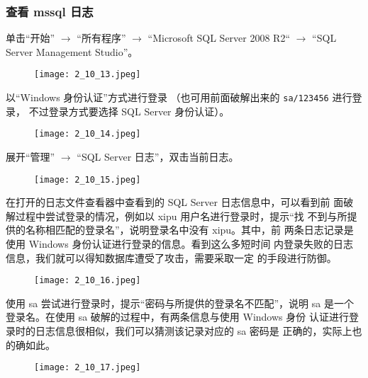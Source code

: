 \subsubsection{查看 mssql 日志}
单击``开始'' $ \rightarrow $ ``所有程序''
$ \rightarrow $ ``Microsoft SQL Server 2008 R2`` $ \rightarrow $
``SQL Server Management Studio''。
\begin{figure}[H]
  \begin{center}
    \texttt{[image: 2\_10\_13.jpeg]}
  \end{center}
\end{figure}

以``Windows 身份认证''方式进行登录
（也可用前面破解出来的 \texttt{sa/123456} 进行登录，
不过登录方式要选择 SQL Server 身份认证）。
\begin{figure}[H]
  \begin{center}
    \texttt{[image: 2\_10\_14.jpeg]}
  \end{center}
\end{figure}

展开``管理'' $ \rightarrow $ ``SQL Server 日志''，双击当前日志。
\begin{figure}[H]
  \begin{center}
    \texttt{[image: 2\_10\_15.jpeg]}
  \end{center}
\end{figure}

在打开的日志文件查看器中查看到的 SQL Server 日志信息中，可以看到前
面破解过程中尝试登录的情况，例如以 xipu 用户名进行登录时，提示``找
不到与所提供的名称相匹配的登录名''，说明登录名中没有 xipu。其中，前
两条日志记录是使用 Windows 身份认证进行登录的信息。看到这么多短时间
内登录失败的日志信息，我们就可以得知数据库遭受了攻击，需要采取一定
的手段进行防御。
\begin{figure}[H]
  \begin{center}
    \texttt{[image: 2\_10\_16.jpeg]}
  \end{center}
\end{figure}

使用 sa 尝试进行登录时，提示``密码与所提供的登录名不匹配''，说明 sa
是一个登录名。在使用 sa 破解的过程中，有两条信息与使用 Windows 身份
认证进行登录时的日志信息很相似，我们可以猜测该记录对应的 sa 密码是
正确的，实际上也的确如此。
\begin{figure}[H]
  \begin{center}
    \texttt{[image: 2\_10\_17.jpeg]}
  \end{center}
\end{figure}
